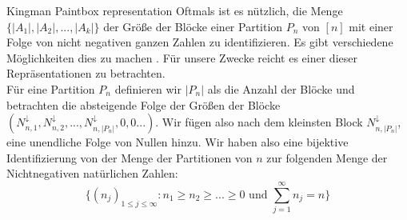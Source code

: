 \begin{section}{Kingman Paintbox representation}
Oftmals ist es nützlich, die Menge $\{|A_1|,|A_2|,...,|A_k|\}$ der Größe der Blöcke einer Partition $P_n$ von $[n]$ mit einer Folge von nicht negativen ganzen Zahlen zu identifizieren. Es gibt verschiedene Möglichkeiten dies zu machen \cite[Seite 15]{pitman2006combinatorial}. Für unsere Zwecke reicht es einer dieser Repräsentationen zu betrachten.
\\
Für eine Partition $P_n$ definieren wir $|P_n|$ als die Anzahl der Blöcke und betrachten die absteigende Folge der Größen der Blöcke $(N^\downarrow_{n,1},N^\downarrow_{n,2},...,N^\downarrow_{n,|P_n|},0,0...)$. Wir fügen also nach dem kleinsten Block $N^\downarrow_{n,|P_n|}$, eine unendliche Folge von Nullen hinzu. Wir haben also eine bijektive Identifizierung von der Menge der Partitionen von $n$ zur folgenden Menge der Nichtnegativen natürlichen Zahlen:
\[
 \{(n_j)_{1\leq j \leq \infty}: n_1 \geq n_2 \geq ... \geq 0 \text{ und } \sum_{j=1}^{\infty}{n_j} = n\}
\] 


\end{section}
